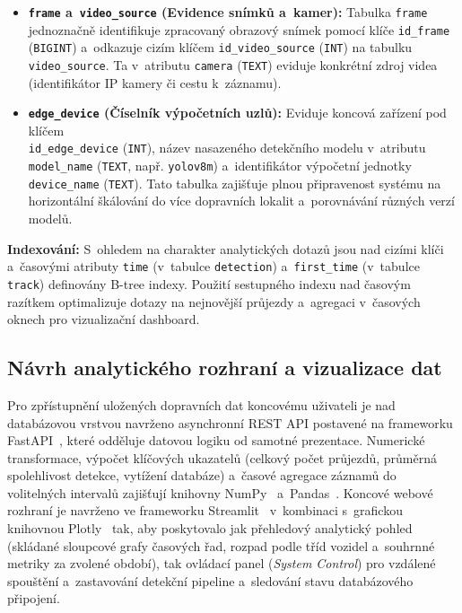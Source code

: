 \begin{itemize}
    \item \textbf{\texttt{frame} a~\texttt{video\_source} (Evidence snímků a~kamer):} Tabulka \texttt{frame} jednoznačně identifikuje zpracovaný obrazový snímek pomocí klíče \texttt{id\_frame} (\texttt{BIGINT}) a~odkazuje cizím klíčem \texttt{id\_video\_source} (\texttt{INT}) na tabulku \texttt{video\_source}. Ta v~atributu \texttt{camera} (\texttt{TEXT}) eviduje konkrétní zdroj videa (identifikátor \acs{IP} kamery či cestu k~záznamu).
    \item \textbf{\texttt{edge\_device} (Číselník výpočetních uzlů):} Eviduje koncová zařízení pod klíčem \\\texttt{id\_edge\_device} (\texttt{INT}), název nasazeného detekčního modelu v~atributu \texttt{model\_name} (\texttt{TEXT}, např. \texttt{yolov8m}) a~identifikátor výpočetní jednotky \texttt{device\_name} (\texttt{TEXT}). Tato tabulka zajišťuje plnou připravenost systému na horizontální škálování do více dopravních lokalit a~porovnávání různých verzí modelů.
\end{itemize}

\textbf{Indexování:} S~ohledem na charakter analytických dotazů jsou nad cizími klíči a~časovými atributy \texttt{time} (v~tabulce \texttt{detection}) a~\texttt{first\_time} (v~tabulce \texttt{track}) definovány B-tree indexy. Použití sestupného indexu nad časovým razítkem optimalizuje dotazy na nejnovější průjezdy a~agregaci v~časových oknech pro vizualizační dashboard.

\subsection{Návrh analytického rozhraní a vizualizace dat}
Pro zpřístupnění uložených dopravních dat koncovému uživateli je nad databázovou vrstvou navrženo asynchronní REST API postavené na frameworku FastAPI~\cite{fastapi_docs}, které odděluje datovou logiku od samotné prezentace. Numerické transformace, výpočet klíčových ukazatelů (celkový počet průjezdů, průměrná spolehlivost detekce, vytížení databáze) a~časové agregace záznamů do volitelných intervalů zajišťují knihovny NumPy~\cite{harris_numpy_2020} a~Pandas~\cite{mckinney_pandas_2010}. Koncové webové rozhraní je navrženo ve frameworku Streamlit~\cite{streamlit_docs} v~kombinaci s~grafickou knihovnou Plotly~\cite{plotly_docs_2015} tak, aby poskytovalo jak přehledový analytický pohled (skládané sloupcové grafy časových řad, rozpad podle tříd vozidel a~souhrnné metriky za zvolené období), tak ovládací panel (\textit{System Control}) pro vzdálené spouštění a~zastavování detekční pipeline a~sledování stavu databázového připojení.